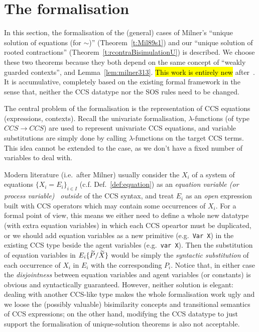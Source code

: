 
\section{The \multivariate formalisation}
\label{sec:multivariate}

In this section, the formalisation of the \multivariate (general)
cases of Milner's ``unique solution of equations (for $\sim$)''
(Theorem~\ref{t:Mil89s1}) and our ``unique solution of rooted
contractions'' (Theorem~\ref{t:rcontraBisimulationU}) is
described.
We choose these two theorems because they both depend on the same
concept of ``weakly guarded contexts'', and Lemma~\ref{lem:milner313}.
\hl{This work is entirely new} after~\cite{EPTCS276.10}.
It is accumulative, completely based on the
existing formal framework in the sense that, neither the CCS datatype nor
the SOS rules need to be changed.

The central problem of the \multivariate formalisation is the
representation of CCS equations (expressions, contexts).
Recall the univariate formalisation, $\lambda$-functions (of type
$CCS\rightarrow CCS$) are used to represent univariate CCS
equations, and variable substitutions are simply done by
calling $\lambda$-functions on the target CCS terms.
This idea cannot be extended to the \multivariate case, as
we don't have a fixed number of variables to deal with.

Modern literature (i.e.~after Milner) usually consider the $X_i$ of
a system of equations $\{X_i = E_i\}_{i\in I}$ (c.f. Def.~\ref{def:equation}) as an
\emph{equation variable (or process variable)}~\citep[p.~102]{Gorrieri:2015jt}
\emph{outside} of the CCS syntax, and treat $E_i$ as an \emph{open} expression
built with CCS operators which may contain some occurrences of $X_i$.
For a formal point of view, this means we either need to define a
whole new datatype (with extra equation variables) in which each CCS
opeartor must be duplicated, or we should add equation variables as a
new primitive (e.g.~\texttt{Var X}) in the existing CCS type beside
the agent variables (e.g.~\texttt{var X}). Then the substitution of equation
variables in $E_i\{\widetilde P/\widetilde X\}$ would be simply the \emph{syntactic substitution} of
each occurrence of $X_i$ in $E_i$ with the corresponding $P_i$. Notice that, in
either case the \emph{disjointness} between equation variables and
agent variables (or constants) is obvious and syntactically
guaranteed. However, neither solution is elegant: dealing with another CCS-like type makes the
whole formalisation work ugly and we loose the (possibly valuable) bisimilarity concepts and
transitional semantics of CCS expressions; on the other hand,
modifying the CCS datatype to just support the formalisation of
unique-solution theorems is also not acceptable.

